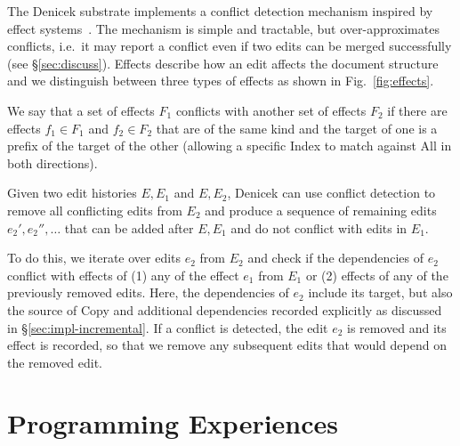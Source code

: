 \documentclass[sigconf,anonymous,screen]{acmart}
\newcommand{\ident}[1]{{\sffamily #1}}
\newcommand{\note}[1]{\textcolor{red}{#1}}
\begin{document}
The Denicek substrate implements a conflict detection mechanism inspired by effect
systems~\cite{lucassen-1988-effects}. The mechanism is simple and tractable, but over-approximates
conflicts, i.e.~it may report a conflict even if two edits can be merged successfully
(see \S\ref{sec:discuss}). Effects describe how an edit affects the document structure
and we distinguish between three types of effects as shown in Fig.~\ref{fig:effects}.

We say that a set of effects $F_1$ conflicts with another set of effects $F_2$ if there
are effects $f_1\in F_1$ and $f_2\in F_2$ that are of the same kind and the target
of one is a prefix of the target of the other (allowing a specific \ident{Index} to
match against \ident{All} in both directions).

Given two edit histories $E, E_1$ and $E, E_2$, Denicek can use conflict detection to remove
all conflicting edits from $E_2$ and produce a sequence of remaining edits $e_2', e_2'', \ldots$
that can be added after $E, E_1$ and do not conflict with edits in $E_1$.

To do this, we iterate over edits $e_2$ from $E_2$ and check if the dependencies of $e_2$
conflict with effects of (1) any of the effect $e_1$ from $E_1$ or (2) effects of any of the
previously removed edits. Here, the dependencies of $e_2$ include its target, but also the source
of \ident{Copy} and additional dependencies recorded explicitly as discussed in
\S\ref{sec:impl-incremental}. If a conflict is detected, the edit $e_2$ is removed and its effect
is recorded, so that we remove any subsequent edits that would depend on the removed edit.



\section{Programming Experiences}
\label{sec:impl}
\end{document}
